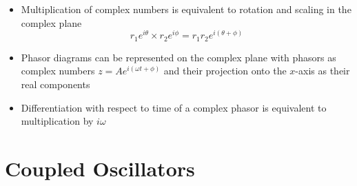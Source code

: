 \documentclass{article}
\begin{document}
\begin{itemize}
  \item Multiplication of complex numbers is equivalent to rotation and scaling in the complex plane \[r_1 e^{i \theta} \times r_2 e^{i \phi} = r_1 r_2 e^{i (\theta + \phi)}\]

  \item Phasor diagrams can be represented on the complex plane with phasors as complex numbers $z = A e^{i (\omega t + \phi)}$ and their projection onto the $x$-axis as their real components

  \item Differentiation with respect to time of a complex phasor is equivalent to multiplication by $i \omega$
\end{itemize}

\section{Coupled Oscillators}
\end{document}
